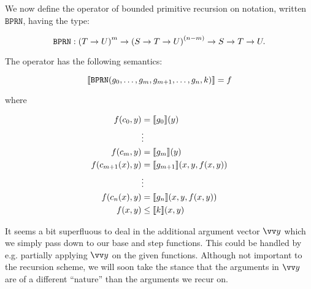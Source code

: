 We now define the operator of bounded primitive recursion on notation, written
$\mathtt{BPRN}$, having the type:

$$\mathtt{BPRN} : \p{T \rightarrow U}^m \rightarrow \p{S \rightarrow T
\rightarrow U}^\p{n-m} \rightarrow S \rightarrow T \rightarrow U.$$

The operator has the following semantics:

$$\sem{\mathtt{BPRN}\p{g_0, \ldots, g_m, g_{m+1}, \ldots, g_n, k}} = f$$

where

\begin{align*}
f\p{c_0,y} &= \sem{g_0}\p{y} \\
          & \vdots \\
f\p{c_m,y} &= \sem{g_m}\p{y} \\
f\p{c_{m+1}\p{x},y} &= \sem{g_{m+1}}\p{x,y,f\p{x,y}} \\
          & \vdots \\
f\p{c_n\p{x},y} &= \sem{g_n}\p{x,y,f\p{x,y}} \\
f\p{x,y} &\leq \sem{k}\p{x,y}
\end{align*}



\begin{remark} It seems a bit superfluous to deal in the additional argument
vector $\vect{y}$ which we simply pass down to our base and step functions.
This could be handled by e.g. partially applying $\vect{y}$ on the given
functions.  Although not important to the recursion scheme, we will soon take
the stance that the arguments in $\vect{y}$ are of a different ``nature'' than
the arguments we recur on.\end{remark}



